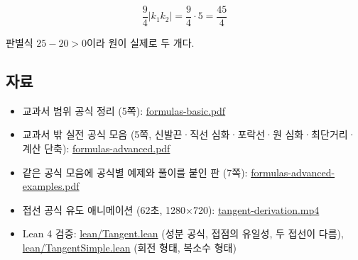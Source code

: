 \[
\frac94|k_1k_2|=\frac94\cdot5=\frac{45}{4}
\]

판별식 \(25-20>0\)이라 원이 실제로 두 개다.

\subsection{자료}

\begin{itemize}
\tightlist
\item
  교과서 범위 공식 정리 (5쪽):
  \href{../materials/geometry/formulas-basic.pdf}{formulas-basic.pdf}
\item
  교과서 밖 실전 공식 모음 (5쪽, 신발끈·직선 심화·포락선·원
  심화·최단거리·계산 단축):
  \href{../materials/geometry/formulas-advanced.pdf}{formulas-advanced.pdf}
\item
  같은 공식 모음에 공식별 예제와 풀이를 붙인 판 (7쪽):
  \href{../materials/geometry/formulas-advanced-examples.pdf}{formulas-advanced-examples.pdf}
\item
  접선 공식 유도 애니메이션 (62초, 1280×720):
  \href{../materials/geometry/tangent-derivation.mp4}{tangent-derivation.mp4}
\item
  Lean 4 검증: \href{../lean/Tangent.lean}{lean/Tangent.lean} (성분
  공식, 접점의 유일성, 두 접선이 다름),
  \href{../lean/TangentSimple.lean}{lean/TangentSimple.lean} (회전 형태,
  복소수 형태)
\end{itemize}
